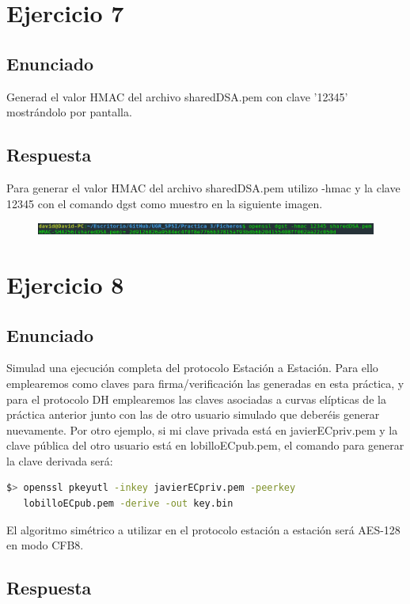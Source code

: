 \documentclass[10pt,a4paper,spanish]{report}
\begin{document}
\chapter{Ejercicio 7}

\section{Enunciado}
\noindent
Generad el valor HMAC del archivo sharedDSA.pem con clave '12345' mostrándolo por pantalla.

\section{Respuesta}
\noindent
Para generar el valor HMAC del archivo sharedDSA.pem utilizo -hmac y la clave 12345 con el comando dgst como muestro en la siguiente imagen.

\begin{figure}[!hbp]
 \centering  \includegraphics[width=1\textwidth]{./Imagenes/7.png}
\end{figure}


\chapter{Ejercicio 8}

\section{Enunciado}
\noindent
Simulad una ejecución completa del protocolo Estación a Estación. Para ello emplearemos como claves para firma/verificación las generadas en esta práctica, y para el protocolo DH emplearemos las claves asociadas a curvas elípticas de la práctica anterior junto con las de otro usuario simulado que deberéis generar nuevamente. Por otro ejemplo, si mi clave privada está en javierECpriv.pem y la clave pública del otro usuario está en lobilloECpub.pem, el comando para generar la clave derivada será:

\begin{lstlisting}[language=bash]
$> openssl pkeyutl -inkey javierECpriv.pem -peerkey
   lobilloECpub.pem -derive -out key.bin
\end{lstlisting}

\noindent
El algoritmo simétrico a utilizar en el protocolo estación a estación será AES-128 en modo CFB8.


\section{Respuesta}
\noindent
\end{document}

